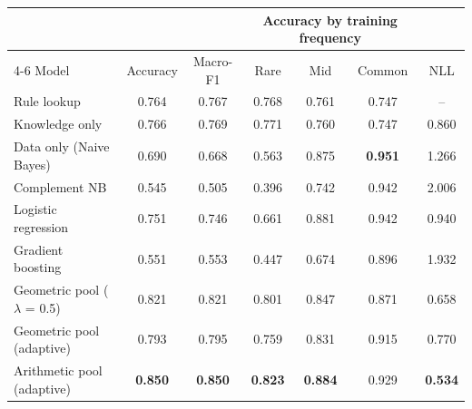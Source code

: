 \begin{tabular*}{\textwidth}{@{\extracolsep{\fill}}lcccccc@{}}
\toprule
 & & & \multicolumn{3}{c}{Accuracy by training frequency} & \\ \cmidrule(lr){4-6}
Model & Accuracy & Macro-F1 & Rare & Mid & Common & NLL \\
\midrule
Rule lookup & 0.764 & 0.767 & 0.768 & 0.761 & 0.747 & -- \\
Knowledge only & 0.766 & 0.769 & 0.771 & 0.760 & 0.747 & 0.860 \\
Data only (Naive Bayes) & 0.690 & 0.668 & 0.563 & 0.875 & \textbf{0.951} & 1.266 \\
Complement NB & 0.545 & 0.505 & 0.396 & 0.742 & 0.942 & 2.006 \\
Logistic regression & 0.751 & 0.746 & 0.661 & 0.881 & 0.942 & 0.940 \\
Gradient boosting & 0.551 & 0.553 & 0.447 & 0.674 & 0.896 & 1.932 \\
Geometric pool ($\lambda$ = 0.5) & 0.821 & 0.821 & 0.801 & 0.847 & 0.871 & 0.658 \\
Geometric pool (adaptive) & 0.793 & 0.795 & 0.759 & 0.831 & 0.915 & 0.770 \\
Arithmetic pool (adaptive) & \textbf{0.850} & \textbf{0.850} & \textbf{0.823} & \textbf{0.884} & 0.929 & \textbf{0.534} \\
\bottomrule
\end{tabular*}
